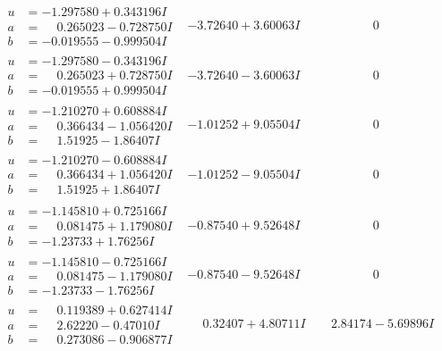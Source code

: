 \documentclass[1p]{elsarticle_modified}
\theoremstyle{definition}
\begin{document}
$$\begin{array}{c|c|c}
\begin{aligned}
u &= -1.297580 + 0.343196 I \\
a &= \phantom{-}0.265023 - 0.728750 I \\
b &= -0.019555 - 0.999504 I\end{aligned}
 & -3.72640 + 3.60063 I & \phantom{-0.000000 } 0 \\ \hline\begin{aligned}
u &= -1.297580 - 0.343196 I \\
a &= \phantom{-}0.265023 + 0.728750 I \\
b &= -0.019555 + 0.999504 I\end{aligned}
 & -3.72640 - 3.60063 I & \phantom{-0.000000 } 0 \\ \hline\begin{aligned}
u &= -1.210270 + 0.608884 I \\
a &= \phantom{-}0.366434 - 1.056420 I \\
b &= \phantom{-}1.51925 - 1.86407 I\end{aligned}
 & -1.01252 + 9.05504 I & \phantom{-0.000000 } 0 \\ \hline\begin{aligned}
u &= -1.210270 - 0.608884 I \\
a &= \phantom{-}0.366434 + 1.056420 I \\
b &= \phantom{-}1.51925 + 1.86407 I\end{aligned}
 & -1.01252 - 9.05504 I & \phantom{-0.000000 } 0 \\ \hline\begin{aligned}
u &= -1.145810 + 0.725166 I \\
a &= \phantom{-}0.081475 + 1.179080 I \\
b &= -1.23733 + 1.76256 I\end{aligned}
 & -0.87540 + 9.52648 I & \phantom{-0.000000 } 0 \\ \hline\begin{aligned}
u &= -1.145810 - 0.725166 I \\
a &= \phantom{-}0.081475 - 1.179080 I \\
b &= -1.23733 - 1.76256 I\end{aligned}
 & -0.87540 - 9.52648 I & \phantom{-0.000000 } 0 \\ \hline\begin{aligned}
u &= \phantom{-}0.119389 + 0.627414 I \\
a &= \phantom{-}2.62220 - 0.47010 I \\
b &= \phantom{-}0.273086 - 0.906877 I\end{aligned}
 & \phantom{-}0.32407 + 4.80711 I & \phantom{-}2.84174 - 5.69896 I \\ \hline\begin{aligned}

\end{aligned}
\end{array}$$
\end{document}
